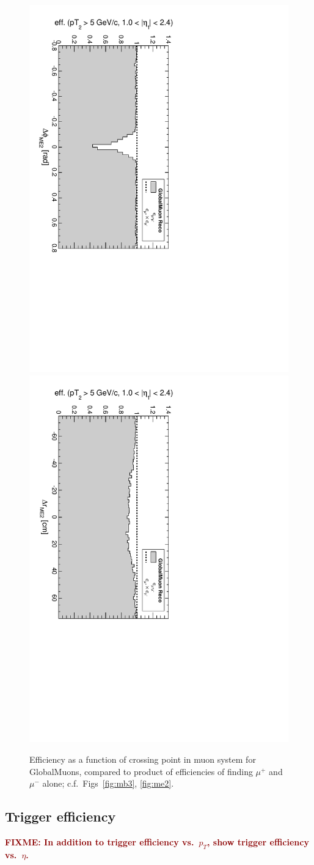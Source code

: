 \documentclass[12pt]{article}
\newcommand{\fixme}[1]{\textcolor{darkred}{\bf FIXME: #1}}
\begin{document}
\begin{figure}[p]
\includegraphics[height=0.5\linewidth, angle=90]{fig/acceptance7_plot/vsme2dphi_GlobalMuons.pdf}
\includegraphics[height=0.5\linewidth, angle=90]{fig/acceptance7_plot/vsme2dr_GlobalMuons.pdf}

\caption{Efficiency as a function of crossing point in muon system for
  GlobalMuons, compared to product of efficiencies of finding $\mu^+$
  and $\mu^-$ alone; c.f.\ Figs~\ref{fig:mb3}, \ref{fig:me2}.}
\end{figure}

\subsection{Trigger efficiency}

\fixme{In addition to trigger efficiency vs.\ $p_T$, show trigger efficiency vs.\ $\eta$.}
\end{document}
